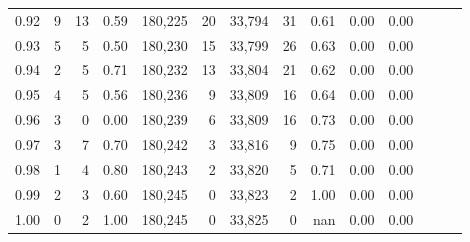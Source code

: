 \begin{tabular}{rrrrrrrrrrrrrr}
0.92 &      9 &     13 &  0.59 &  180,225 &       20 &  33,794 &      31 &  0.61 &  0.00 &      0.00 \\
0.93 &      5 &      5 &  0.50 &  180,230 &       15 &  33,799 &      26 &  0.63 &  0.00 &      0.00 \\
0.94 &      2 &      5 &  0.71 &  180,232 &       13 &  33,804 &      21 &  0.62 &  0.00 &      0.00 \\
0.95 &      4 &      5 &  0.56 &  180,236 &        9 &  33,809 &      16 &  0.64 &  0.00 &      0.00 \\
0.96 &      3 &      0 &  0.00 &  180,239 &        6 &  33,809 &      16 &  0.73 &  0.00 &      0.00 \\
0.97 &      3 &      7 &  0.70 &  180,242 &        3 &  33,816 &       9 &  0.75 &  0.00 &      0.00 \\
0.98 &      1 &      4 &  0.80 &  180,243 &        2 &  33,820 &       5 &  0.71 &  0.00 &      0.00 \\
0.99 &      2 &      3 &  0.60 &  180,245 &        0 &  33,823 &       2 &  1.00 &  0.00 &      0.00 \\
1.00 &      0 &      2 &  1.00 &  180,245 &        0 &  33,825 &       0 &   nan &  0.00 &      0.00 \\
\bottomrule
\end{tabular}

